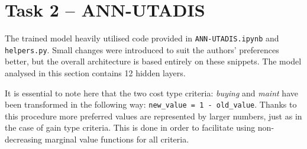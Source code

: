 \documentclass[../main.tex]{subfiles}
\begin{document}
\section{Task 2 -- ANN-UTADIS}

The trained model heavily utilised code provided in \verb|ANN-UTADIS.ipynb| and \verb|helpers.py|.
Small changes were introduced to suit the authors' preferences better, but the overall
architecture is based entirely on these snippets.
The model analysed in this section contains 12 hidden layers.

It is essential to note here that the two cost type criteria: \emph{buying} and \emph{maint}
have been transformed in the following way:
\verb|new_value = 1 - old_value|.
Thanks to this procedure more preferred values are represented by larger numbers,
just as in the case of gain type criteria.
This is done in order to facilitate using non-decreasing marginal value functions for all criteria.
\end{document}
